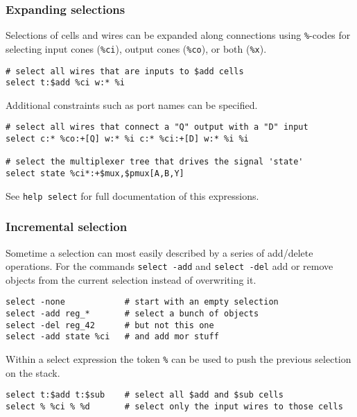 \subsubsection{Expanding selections}

\begin{frame}[fragile]{\subsubsecname}
Selections of cells and wires can be expanded along connections using {\tt \%}-codes
for selecting input cones ({\tt \%ci}), output cones ({\tt \%co}), or both ({\tt \%x}).

\medskip
\begin{lstlisting}[xleftmargin=0.5cm, basicstyle=\ttfamily\fontsize{8pt}{10pt}\selectfont, language=ys]
# select all wires that are inputs to $add cells
select t:$add %ci w:* %i
\end{lstlisting}

\bigskip
Additional constraints such as port names can be specified.

\medskip
\begin{lstlisting}[xleftmargin=0.5cm, basicstyle=\ttfamily\fontsize{8pt}{10pt}\selectfont, language=ys]
# select all wires that connect a "Q" output with a "D" input
select c:* %co:+[Q] w:* %i c:* %ci:+[D] w:* %i %i

# select the multiplexer tree that drives the signal 'state'
select state %ci*:+$mux,$pmux[A,B,Y]
\end{lstlisting}

\bigskip
See {\tt help select} for full documentation of this expressions.
\end{frame}

\subsubsection{Incremental selection}

\begin{frame}[fragile]{\subsubsecname}
Sometime a selection can most easily described by a series of add/delete operations.
For the commands {\tt select -add} and {\tt select -del} add or remove objects
from the current selection instead of overwriting it.

\medskip
\begin{lstlisting}[xleftmargin=0.5cm, basicstyle=\ttfamily\fontsize{8pt}{10pt}\selectfont, language=ys]
select -none            # start with an empty selection
select -add reg_*       # select a bunch of objects
select -del reg_42      # but not this one
select -add state %ci   # and add mor stuff
\end{lstlisting}

\bigskip
Within a select expression the token {\tt \%} can be used to push the previous selection
on the stack.

\medskip
\begin{lstlisting}[xleftmargin=0.5cm, basicstyle=\ttfamily\fontsize{8pt}{10pt}\selectfont, language=ys]
select t:$add t:$sub    # select all $add and $sub cells
select % %ci % %d       # select only the input wires to those cells
\end{lstlisting}
\end{frame}

